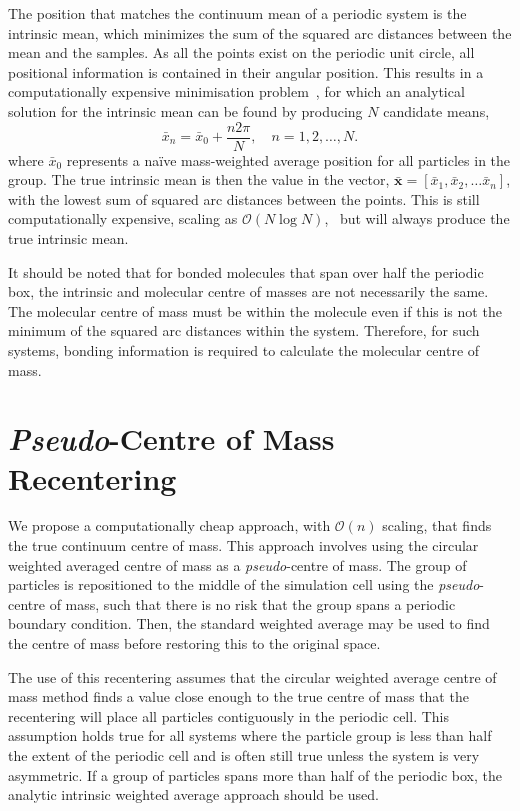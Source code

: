 \documentclass[reprint,superscriptaddress,nobibnotes,amsmath,amssymb,aip]{revtex4-2}
\begin{document}
The position that matches the continuum mean of a periodic system is the intrinsic mean, which minimizes the sum of the squared arc distances between the mean and the samples. 
As all the points exist on the periodic unit circle, all positional information is contained in their angular position. 
This results in a computationally expensive minimisation problem~\cite{hotz_extrinsic_2013}, for which an analytical solution for the intrinsic mean can be found by producing $N$ candidate means,
%
\begin{equation}
\bar{x}_{n} = \bar{x}_0 + \frac{n 2\pi}{N}, \quad n = 1, 2, \dots, N.
\end{equation}
%
where $\bar{x}_0$ represents a naïve mass-weighted average position for all particles in the group.
The true intrinsic mean is then the value in the vector, $\bar{\bm{x}} = [\bar{x}_{1}, \bar{x}_{2}, \ldots \bar{x}_{n}]$, with the lowest sum of squared arc distances between the points. 
This is still computationally expensive, scaling as $\mathcal{O}(N\log N)$,~\cite{hotz_intrinsic_2011} but will always produce the true intrinsic mean.

It should be noted that for bonded molecules that span over half the periodic box, the intrinsic and molecular centre of masses are not necessarily the same.
The molecular centre of mass must be within the molecule even if this is not the minimum of the squared arc distances within the system.
Therefore, for such systems, bonding information is required to calculate the molecular centre of mass. 

\section{\emph{Pseudo}-Centre of Mass Recentering}

We propose a computationally cheap approach, with $\mathcal{O}(n)$ scaling, that finds the true continuum centre of mass. 
This approach involves using the circular weighted averaged centre of mass as a \emph{pseudo}-centre of mass. 
The group of particles is repositioned to the middle of the simulation cell using the \emph{pseudo}-centre of mass, such that there is no risk that the group spans a periodic boundary condition. 
Then, the standard weighted average may be used to find the centre of mass before restoring this to the original space. 

The use of this recentering assumes that the circular weighted average centre of mass method finds a value close enough to the true centre of mass that the recentering will place all particles contiguously in the periodic cell. 
This assumption holds true for all systems where the particle group is less than half the extent of the periodic cell and is often still true unless the system is very asymmetric. 
If a group of particles spans more than half of the periodic box, the analytic intrinsic weighted average approach should be used. 
\end{document}

